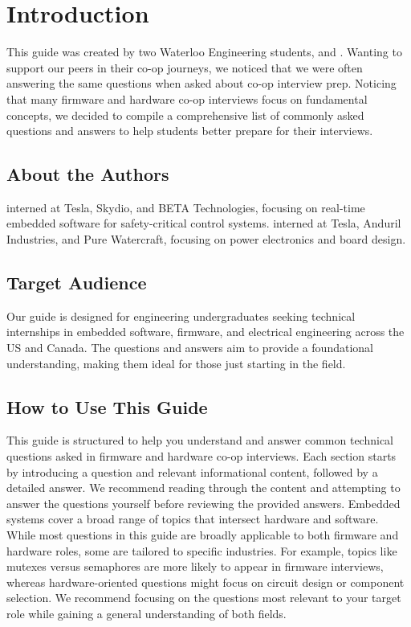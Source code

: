 \documentclass[main.tex]{subfiles}
\begin{document}
\section{Introduction}

This guide was created by two Waterloo Engineering students,  and . Wanting to support our peers in their co-op journeys, we noticed that we were often answering the same questions when asked about co-op interview prep. Noticing that many firmware and hardware co-op interviews focus on fundamental concepts, we decided to compile a comprehensive list of commonly asked questions and answers to help students better prepare for their interviews.

\subsection{About the Authors}
 interned at Tesla, Skydio, and BETA Technologies, focusing on real-time embedded software for safety-critical control systems.
\newline
\newline
{} interned at Tesla, Anduril Industries, and Pure Watercraft, focusing on power electronics and board design.

\subsection{Target Audience}
Our guide is designed for engineering undergraduates seeking technical internships in embedded software, firmware, and electrical engineering across the US and Canada. The questions and answers aim to provide a foundational understanding, making them ideal for those just starting in the field.

\subsection{How to Use This Guide}
This guide is structured to help you understand and answer common technical questions asked in firmware and hardware co-op interviews. Each section starts by introducing a question and relevant informational content, followed by a detailed answer. We recommend reading through the content and attempting to answer the questions yourself before reviewing the provided answers.
\newline
\newnoindentpara Embedded systems cover a broad range of topics that intersect hardware and software. While most questions in this guide are broadly applicable to both firmware and hardware roles, some are tailored to specific industries. For example, topics like mutexes versus semaphores are more likely to appear in firmware interviews, whereas hardware-oriented questions might focus on circuit design or component selection. We recommend focusing on the questions most relevant to your target role while gaining a general understanding of both fields.
\end{document}
